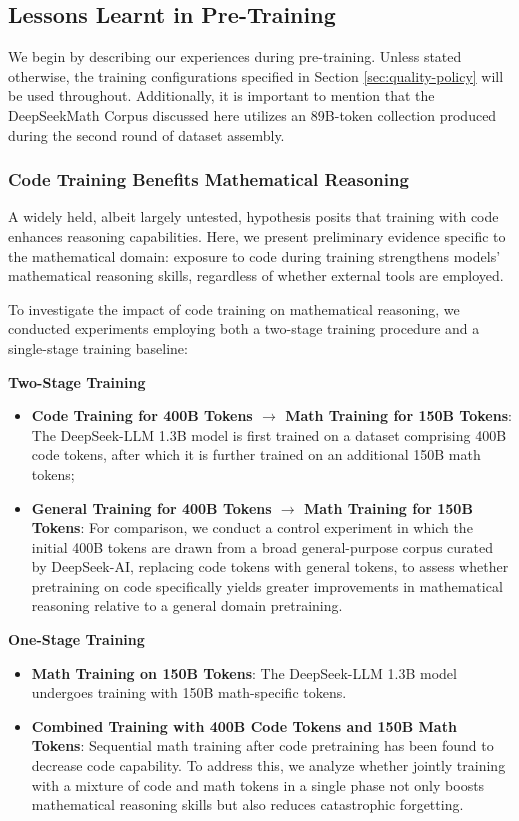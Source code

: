 \begin{itemize}[topsep=0pt]
\begin{itemize}[topsep=0pt]
\subsection{Lessons Learnt in Pre-Training}

We begin by describing our experiences during pre-training. Unless stated otherwise, the training configurations specified in Section \ref{sec:quality-policy} will be used throughout. Additionally, it is important to mention that the DeepSeekMath Corpus discussed here utilizes an 89B-token collection produced during the second round of dataset assembly.

\subsubsection{Code Training Benefits Mathematical Reasoning}

A widely held, albeit largely untested, hypothesis posits that training with code enhances reasoning capabilities. Here, we present preliminary evidence specific to the mathematical domain: exposure to code during training strengthens models’ mathematical reasoning skills, regardless of whether external tools are employed.

To investigate the impact of code training on mathematical reasoning, we conducted experiments employing both a two-stage training procedure and a single-stage training baseline:

\textbf{Two-Stage Training}

\begin{itemize}[topsep=0pt]
    \item \textbf{Code Training for 400B Tokens $\rightarrow$ Math Training for 150B Tokens}: The DeepSeek-LLM 1.3B model is first trained on a dataset comprising 400B code tokens, after which it is further trained on an additional 150B math tokens;
    \item \textbf{General Training for 400B Tokens $\rightarrow$ Math Training for 150B Tokens}: For comparison, we conduct a control experiment in which the initial 400B tokens are drawn from a broad general-purpose corpus curated by DeepSeek-AI, replacing code tokens with general tokens, to assess whether pretraining on code specifically yields greater improvements in mathematical reasoning relative to a general domain pretraining.
\end{itemize}

\textbf{One-Stage Training}

\begin{itemize}[topsep=0pt]
    \item \textbf{Math Training on 150B Tokens}: The DeepSeek-LLM 1.3B model undergoes training with 150B math-specific tokens.
    \item \textbf{Combined Training with 400B Code Tokens and 150B Math Tokens}: Sequential math training after code pretraining has been found to decrease code capability. To address this, we analyze whether jointly training with a mixture of code and math tokens in a single phase not only boosts mathematical reasoning skills but also reduces catastrophic forgetting.
\end{itemize}


\end{itemize}
\end{itemize}
